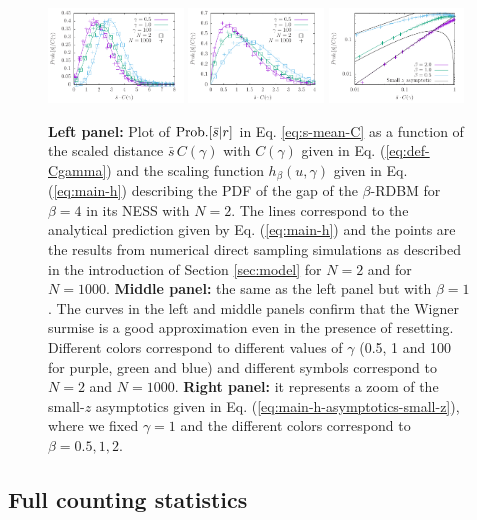 \documentclass[onecolumn,superscriptaddress,
 amsmath,amssymb,
 aps,
 prd,
]{revtex4-1}
\begin{document}
\begin{figure}[t]
\centering
\includegraphics[width=0.32\textwidth]{gaps4.pdf}
\hfill
\includegraphics[width=0.32\textwidth]{gaps1.pdf}
\hfill
\includegraphics[width=0.32\textwidth]{gapssmallz.pdf}
\caption{{\bf Left panel:} Plot of ${\rm Prob.}[\bar{s}\vert r]$ in Eq. \eqref{eq:s-mean-C} as a function of the scaled distance $\bar{s}\,C(\gamma)$ with $C(\gamma)$ given in Eq. (\ref{eq:def-Cgamma}) and the scaling function $h_{\beta}(u, \gamma)$ given in Eq. (\ref{eq:main-h}) describing the PDF of the gap of the $\beta$-RDBM for $\beta=4$ in its NESS with $N=2$. The lines correspond to the analytical prediction given by Eq. (\ref{eq:main-h}) and the points are the results from numerical direct sampling simulations as described in the introduction of Section \ref{sec:model} for $N=2$ and for $N=1000$. {\bf Middle panel:} the same as the left panel but with $\beta = 1$. The curves in
the left and middle panels confirm that the Wigner surmise is a good approximation even in the presence of resetting. Different colors correspond to different values of $\gamma$ (0.5, 1 and 100 for purple, green and blue) and different symbols correspond to $N=2$ and $N=1000$. {\bf Right panel:} 
it represents  a zoom of the small-$z$ asymptotics given in Eq. (\ref{eq:main-h-asymptotics-small-z}), where we fixed $\gamma = 1$ and the different colors correspond to $\beta = 0.5,1,2$.}\label{fig:gaps}
\end{figure}




\subsection{Full counting statistics} \label{sec:model-fcs}
\end{document}
